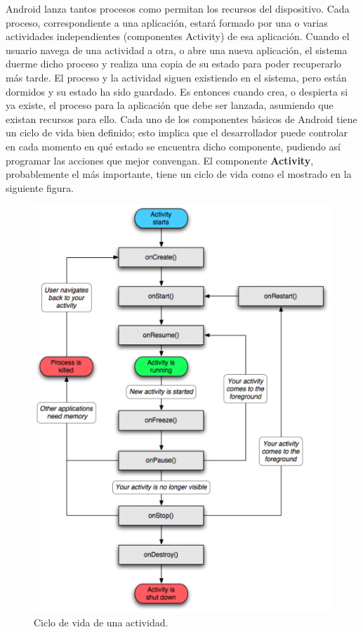\documentclass[letterpaper,12pt,openany,oneside]{book}
\begin{document}
   Android lanza tantos procesos como permitan los recursos del dispositivo. Cada proceso, correspondiente a una aplicación, estará formado por una o varias actividades independientes (componentes Activity) de esa aplicación. Cuando el usuario navega de una actividad a otra, o abre una nueva aplicación, el sistema duerme dicho proceso y realiza una copia de su estado para poder recuperarlo más tarde. El proceso y la actividad siguen existiendo en el sistema, pero están dormidos y su estado ha sido guardado. Es entonces cuando crea, o despierta si ya existe, el proceso para la aplicación que debe ser lanzada, asumiendo que existan recursos para ello.
   Cada uno de los componentes básicos de Android tiene un ciclo de vida bien definido; esto implica que el desarrollador puede controlar en cada momento en qué estado se encuentra dicho componente, pudiendo así programar las acciones que mejor convengan. El componente \textbf{Activity}, probablemente el más importante, tiene un ciclo de vida como el mostrado en la siguiente figura.

\begin{figure}[!ht]
  \centering
    \includegraphics[width=0.6\textwidth\ ,angle=0]{activity_lifecycle.png}
  \caption{Ciclo de vida de una actividad.}
  \label{fig:Ciclo de vida de una actividad. }
\end{figure}
\end{document}
